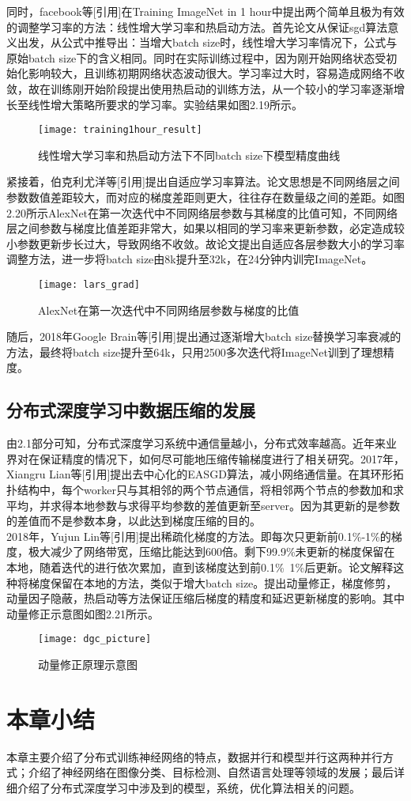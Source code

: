 同时，facebook等[引用]在Training ImageNet in 1 hour中提出两个简单且极为有效的调整学习率的方法：线性增大学习率和热启动方法。首先论文从保证sgd算法意义出发，从公式中推导出：当增大batch size时，线性增大学习率情况下，公式与原始batch size下的含义相同。同时在实际训练过程中，因为刚开始网络状态受初始化影响较大，且训练初期网络状态波动很大。学习率过大时，容易造成网络不收敛，故在训练刚开始阶段提出使用热启动的训练方法，从一个较小的学习率逐渐增长至线性增大策略所要求的学习率。实验结果如图2.19所示。\\
\begin{figure}[htp]
\centering
\texttt{[image: training1hour\_result]}
\caption{线性增大学习率和热启动方法下不同batch size下模型精度曲线}
\end{figure}
紧接着，伯克利尤洋等[引用]提出自适应学习率算法。论文思想是不同网络层之间参数数值差距较大，而对应的梯度差距则更大，往往存在数量级之间的差距。如图2.20所示AlexNet在第一次迭代中不同网络层参数与其梯度的比值可知，不同网络层之间参数与梯度比值差距非常大，如果以相同的学习率来更新参数，必定造成较小参数更新步长过大，导致网络不收敛。故论文提出自适应各层参数大小的学习率调整方法，进一步将batch size由8k提升至32k，在24分钟内训完ImageNet。\\
\begin{figure}[htp]
\centering
\texttt{[image: lars\_grad]}
\caption{AlexNet在第一次迭代中不同网络层参数与梯度的比值}
\end{figure}
随后，2018年Google Brain等[引用]提出通过逐渐增大batch size替换学习率衰减的方法，最终将batch size提升至64k，只用2500多次迭代将ImageNet训到了理想精度。\\
\subsection{分布式深度学习中数据压缩的发展}
由2.1部分可知，分布式深度学习系统中通信量越小，分布式效率越高。近年来业界对在保证精度的情况下，如何尽可能地压缩传输梯度进行了相关研究。2017年，Xiangru Lian等[引用]提出去中心化的EASGD算法，减小网络通信量。在其环形拓扑结构中，每个worker只与其相邻的两个节点通信，将相邻两个节点的参数加和求平均，并求得本地参数与求得平均参数的差值更新至server。因为其更新的是参数的差值而不是参数本身，以此达到梯度压缩的目的。\\
2018年，Yujun Lin等[引用]提出稀疏化梯度的方法。即每次只更新前0.1\%-1\%的梯度，极大减少了网络带宽，压缩比能达到600倍。剩下99.9\%未更新的梯度保留在本地，随着迭代的进行依次累加，直到该梯度达到前0.1\%~1\%后更新。论文解释这种将梯度保留在本地的方法，类似于增大batch size。提出动量修正，梯度修剪，动量因子隐蔽，热启动等方法保证压缩后梯度的精度和延迟更新梯度的影响。其中动量修正示意图如图2.21所示。
\begin{figure}[htp]
\centering
\texttt{[image: dgc\_picture]}
\caption{动量修正原理示意图}
\end{figure}

\section{本章小结}
本章主要介绍了分布式训练神经网络的特点，数据并行和模型并行这两种并行方式；介绍了神经网络在图像分类、目标检测、自然语言处理等领域的发展；最后详细介绍了分布式深度学习中涉及到的模型，系统，优化算法相关的问题。




